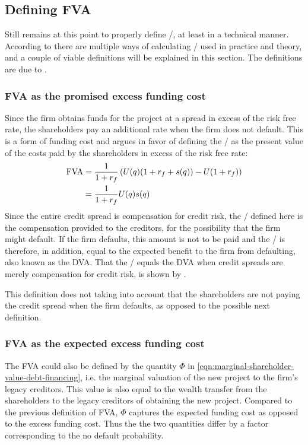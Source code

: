 \documentclass[../main.tex]{subfiles}
\begin{document}
    \subsection{Defining FVA}
        Still remains at this point to properly define \FVA/, at least in a technical manner.
        According to \cite{ADS2019} there are multiple ways of calculating \FVA/ used in practice and theory,
        and a couple of viable definitions will be explained in this section.
        The definitions are due to \cite{Hillion2016}.

        \subsubsection{FVA as the promised excess funding cost}
            Since the firm obtains funds for the project at a spread in excess of the risk free rate, 
            the shareholders pay an additional rate when the firm does not default. 
            This is a form of funding cost and argues in favor of defining the \FVA/ as
            the present value of the costs paid by the shareholders in excess of the risk free rate:
            \begin{align}
                \FVA/ 
                &= \discountfactor \left(
                    U(q) (1 + \rfrate + s(q))
                    - U (1 + \rfrate)
                \right) 
                \nonumber \\
                &= \discountfactor U(q) s(q)
                \label{eqn:fva-as-promised-excess-funding-cost}
            \end{align}
            Since the entire credit spread is compensation for credit risk,
            the \FVA/ defined here is the compensation provided to the creditors,
            for the possibility that the firm might default. 
            If the firm defaults, this amount is not to be paid and the \FVA/ is therefore, in addition, 
            equal to the expected benefit to the firm from defaulting, also known as the DVA. 
            That the \FVA/ equals the DVA when credit spreads are merely compensation for credit risk, 
            is shown by \cite{HullWhiteFVA}.

            This definition does not taking into account that the shareholders are not paying the credit spread
            when the firm defaults, as opposed to the possible next definition.

        \subsubsection{FVA as the expected excess funding cost}
            The FVA could also be defined by the quantity $\Phi$ in \cref{eqn:marginal-shareholder-value-debt-financing}, 
            i.e. the marginal valuation of the new project to the firm's legacy creditors. 
            This value is also equal to the wealth transfer from the shareholders to the legacy creditors
            of obtaining the new project.
            Compared to the previous definition of FVA, 
            $\Phi$ captures the expected funding cost as opposed to the excess funding cost.
            Thus the the two quantities differ by a factor corresponding to the no default probability.
\end{document}
